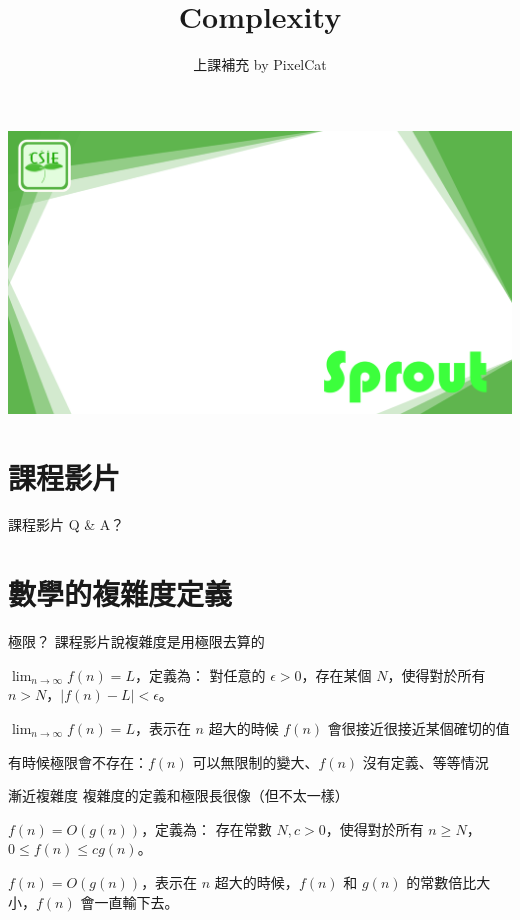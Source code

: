 \documentclass[aspectratio=169]{beamer}
\title{Complexity}
\author{上課補充 by PixelCat} %
\date{}
\begin{document}
{
    {\includegraphics[width=\paperwidth,height=\paperheight,keepaspectratio]{background_title.png}}
    \begin{frame}
        \titlepage
    \end{frame}
}

\section{課程影片}

\begin{frame}{課程影片}
    Q \& A？
\end{frame}


\section{數學的複雜度定義}

\begin{frame}{極限？}
  課程影片說複雜度是用極限去算的

   {
    \begin{definition}[極限]
      $\lim_{n \to \infty} f(n) = L$，定義為：
      對任意的 $\epsilon > 0$，存在某個 $N$，使得對於所有 $n > N$，$|f(n) - L| < \epsilon$。
    \end{definition}
  }

   {
    \begin{definition}[極限（白話版本）]
      $\lim_{n \to \infty} f(n) = L$，表示在 $n$ 超大的時候 $f(n)$ 會很接近很接近某個確切的值
    \end{definition}

    有時候極限會不存在：$f(n)$ 可以無限制的變大、$f(n)$ 沒有定義、等等情況
  }
\end{frame}

\begin{frame}{漸近複雜度}
  複雜度的定義和極限長很像（但不太一樣）

   {
    \begin{definition}
      $f(n) = O(g(n))$，定義為：
      存在常數 $N, c > 0$，使得對於所有 $n \ge N$，$0 \le f(n) \le cg(n)$。
    \end{definition}
  }

   {
    \begin{definition}
      $f(n) = O(g(n))$，表示在 $n$ 超大的時候，$f(n)$ 和 $g(n)$ 的常數倍比大小，$f(n)$ 會一直輸下去。
    \end{definition}
  }
\end{frame}
\end{document}
